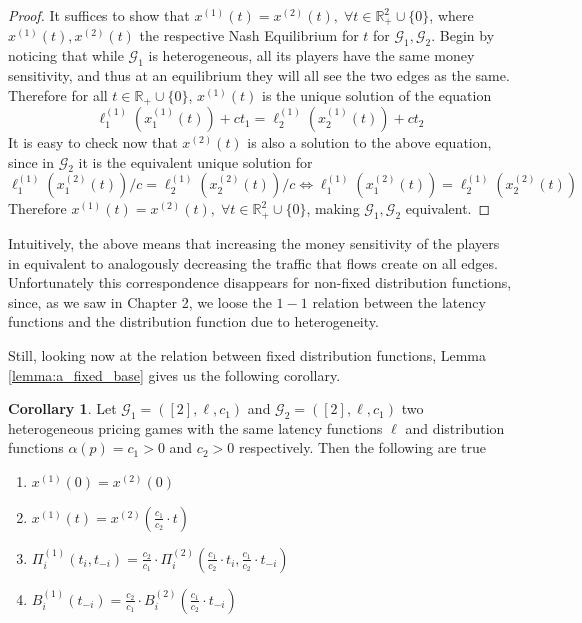 \documentclass[10pt,a4paper]{book}
\newcommand{\R}{\mathbb{R}}
\newcommand{\Gm}{\mathcal{G}}
\theoremstyle{definition}
\newtheorem{corollary}[definition]{Corollary}
\theoremstyle{comment}
\begin{document}
\begin{proof}
	It suffices to show that $x^{(1)}(t) = x^{(2)}(t), \; \forall t \in \R_+^2 \cup \{0\}$, where $x^{(1)}(t), x^{(2)}(t)$ the respective Nash Equilibrium for $t$ for $\Gm_1, \Gm_2$.
	Begin by noticing that while $\Gm_1$ is heterogeneous, all its players have the same money sensitivity, and thus at an equilibrium they will all see the two edges as the same.
	Therefore for all $t \in \R_+ \cup \{0\}$, $x^{(1)}(t)$ is the unique solution of the equation
	\[
		\ell_1^{(1)}(x_1^{(1)}(t)) + ct_1 = \ell_2^{(1)}(x_2^{(1)}(t)) + ct_2
	\]
	It is easy to check now that $x^{(2)}(t)$ is also a solution to the above equation, since in $\Gm_2$ it is the equivalent unique solution for
	\[
		\ell_1^{(1)}(x_1^{(2)}(t)) / c = \ell_2^{(1)}(x_2^{(2)}(t)) / c \Leftrightarrow \ell_1^{(1)}(x_1^{(2)}(t)) = \ell_2^{(1)}(x_2^{(2)}(t)) 
	\]
	Therefore $x^{(1)}(t) = x^{(2)}(t), \; \forall t \in \R_+^2 \cup \{0\}$, making $\Gm_1, \Gm_2$ equivalent.
\end{proof}
Intuitively, the above means that increasing the money sensitivity of the players in equivalent to analogously decreasing the traffic that flows create on all edges.
Unfortunately this correspondence  disappears for non-fixed distribution functions, since, as we saw in Chapter 2, we loose the $1-1$ relation between the latency functions and the distribution function due to heterogeneity.

Still, looking now at the relation between fixed distribution functions, Lemma \ref{lemma:a_fixed_base} gives us the following corollary.
\begin{corollary}
		Let $\Gm_1 = ([2], \ell, c_1)$ and $\Gm_2 = ([2], \ell, c_1)$ two heterogeneous pricing games with the same latency functions $\ell$ and distribution functions $\alpha(p) = c_1 > 0$ and $c_2 > 0$ respectively.
		Then the following are true
		\begin{enumerate}[$(i)$]
			\item $x^{(1)}(0) = x^{(2)}(0)$
			\item $x^{(1)}(t) = x^{(2)}\left(\frac{c_1}{c_2} \cdot t\right)$
			\item $\Pi_i^{(1)}(t_i, t_{-i}) = \frac{c_2}{c_1} \cdot \Pi_i^{(2)}\left(\frac{c_1}{c_2} \cdot t_i, \frac{c_1}{c_2} \cdot t_{-i}\right)$
			\item $B_i^{(1)}(t_{-i}) = \frac{c_2}{c_1} \cdot B_i^{(2)}\left(\frac{c_1}{c_2} \cdot t_{-i}\right)$
		\end{enumerate}
\end{corollary}
\end{document}
